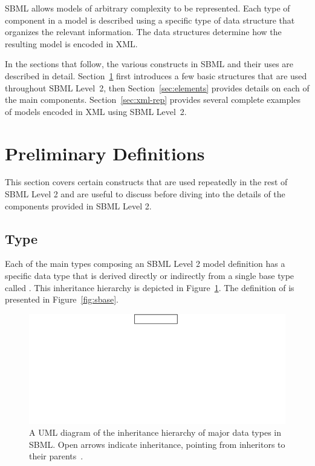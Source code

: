 \documentclass[10pt,twocolumntoc]{cekarticle}
\newcommand{\vref}[1]{\ref{#1}}
\begin{document}
SBML allows models of arbitrary complexity to be represented.  Each type of
component in a model is described using a specific type of data structure
that organizes the relevant information.  The data structures determine how
the resulting model is encoded in XML.

In the sections that follow, the various constructs in SBML and their uses
are described in detail.  Section~\ref{sec:general} first introduces a few
basic structures that are used throughout SBML Level~2, then
Section~\ref{sec:elements} provides details on each of the main components.
Section~\ref{sec:xml-rep} provides several complete examples of models
encoded in XML using SBML Level~2.


\section{Preliminary Definitions}
\label{sec:general}

This section covers certain constructs that are used repeatedly in
the rest of SBML Level 2 and are useful to discuss before diving
into the details of the components provided in SBML Level 2.

\subsection{Type }
\label{sec:sbase}

Each of the main types composing an SBML Level 2 model definition has a
specific data type that is derived directly or indirectly from a single
base type called .  This inheritance hierarchy is depicted in
Figure~\vref{fig:top-level}.  The definition of  is presented
in Figure~\vref{fig:sbase}.

\begin{figure}[h]
  \vspace*{8pt}
  \centering
  \includegraphics[scale = 0.7]{top-level}
  \caption{A UML diagram of the inheritance hierarchy of major data types
    in SBML.  Open arrows indicate inheritance, pointing from inheritors to
    their parents~\citep{eriksson:1998,oestereich:1999}.}
  \label{fig:top-level}
\end{figure}
\end{document}

